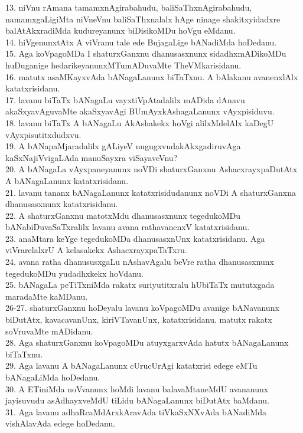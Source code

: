 \documentclass{article}
\begin{document}
13. niVnu rAmana tamamxnAgirabahudu, baliSaThxnAgirabahudu, namamxgaLigiMta niVneVnu baliSaThxnalalx hAge ninage shakitxyidadxre balAtAkxradiMda kudureyanunx biDisikoMDu hoVgu eMdanu.\\
14. hiVgenunxtAtx A viVranu tale ede BujagaLige bANadiMda hoDedanu.\\
15. Aga koVpagoMDa I shaturxGanxnu dhanusasxnunx sidadhxmADikoMDu huDuganige hedarikeyanunxMTumADuvaMte TheVMkarisidanu.\\
16. matutx asaMKayxvAda bANagaLanunx biTaTxnu. A bAlakanu avanenxlAlx katatxrisidanu.\\
17. lavanu biTaTx bANagaLu vayxtiVpAtadalilx mADida dAnavu akaSxyavAguvaMte akaSxyavAgi BUmAyxkAshagaLanunx vAyxpisiduvu.\\
18. lavanu biTaTx A bANagaLu AkAshakekx hoVgi alilxMdelAlx kaDegU vAyxpisutitxdudxvu.\\
19. A bANapaMjaradalilx gALiyeV nugugxvudakAkxgadiruvAga kaSxNajiVvigaLAda manuSayxra viSayaveVnu?\\
20. A bANagaLa vAyxpaneyanunx noVDi shaturxGanxnu AshacxrayxpaDutAtx A bANagaLanunx katatxrisidanu.\\
21. lavanu tananx bANagaLanunx katatxrisidudanunx noVDi A shaturxGanxna dhanusasxnunx katatxrisidanu.\\
22. A shaturxGanxnu matotxMdu dhanusasxnunx tegedukoMDu bANabiDuvaSaTxralilx lavanu avana rathavanenxV katatxrisidanu.\\
23. anaMtara keYge tegedukoMDa dhanusasxnUnx katatxrisidanu. Aga viVrarelalxrU A kelasakekx AshacxrayxpaTaTxru.\\
24. avana ratha dhanususxgaLu nAshavAgalu beVre ratha dhanusasxnunx tegedukoMDu yudadhxkekx hoVdanu.\\
25. bANagaLa peTiTxniMda rakatx suriyutitxralu hUbiTaTx mututxgada maradaMte kaMDanu.\\
26-27. shaturxGanxnu hoDeyalu lavanu koVpagoMDu avanige bANavanunx biDutAtx, kavacavanUnx, kiriVTavanUnx, katatxrisidanu. matutx rakatx soVruvaMte mADidanu.\\
28. Aga shaturxGanxnu koVpagoMDu atuyxgarxvAda hatutx bANagaLanunx biTaTxnu.\\
29. Aga lavanu A bANagaLanunx cUrucUrAgi katatxrisi edege eMTu bANagaLiMda hoDedanu.\\
30. A ETiniMda noVvanunx hoMdi lavanu balavaMtaneMdU avananunx jayisuvudu asAdhayxveMdU tiLidu bANagaLanunx biDutAtx baMdanu.\\
31. Aga lavanu adhaRcaMdArxkAravAda tiVkaSxNXvAda bANadiMda vishAlavAda edege hoDedanu.\\
\end{document}
